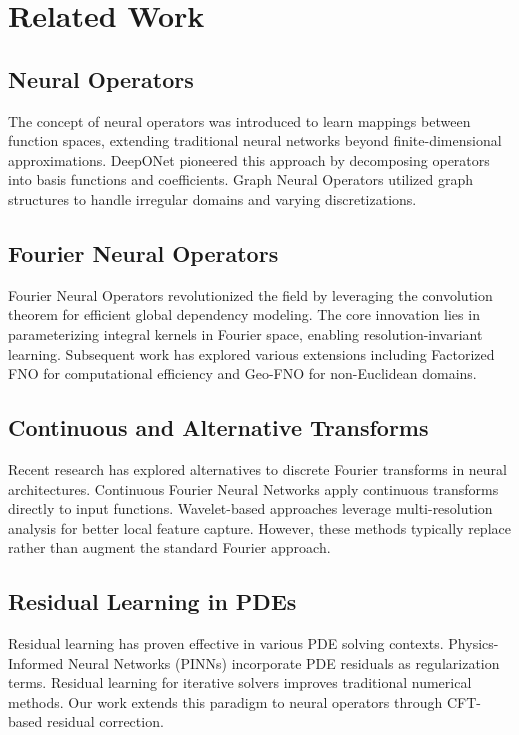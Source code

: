 \documentclass[11pt,twocolumn]{article}
\begin{document}
\section{Related Work}

\subsection{Neural Operators}
The concept of neural operators was introduced to learn mappings between function spaces, extending traditional neural networks beyond finite-dimensional approximations. DeepONet \citep{lu2021learning} pioneered this approach by decomposing operators into basis functions and coefficients. Graph Neural Operators \citep{li2020neural} utilized graph structures to handle irregular domains and varying discretizations.

\subsection{Fourier Neural Operators}
Fourier Neural Operators \citep{li2020fourier} revolutionized the field by leveraging the convolution theorem for efficient global dependency modeling. The core innovation lies in parameterizing integral kernels in Fourier space, enabling resolution-invariant learning. Subsequent work has explored various extensions including Factorized FNO \citep{tran2021factorized} for computational efficiency and Geo-FNO \citep{li2022fourier} for non-Euclidean domains.

\subsection{Continuous and Alternative Transforms}
Recent research has explored alternatives to discrete Fourier transforms in neural architectures. Continuous Fourier Neural Networks \citep{chen2021continuous} apply continuous transforms directly to input functions. Wavelet-based approaches \citep{gupta2021multiwavelet} leverage multi-resolution analysis for better local feature capture. However, these methods typically replace rather than augment the standard Fourier approach.

\subsection{Residual Learning in PDEs}
Residual learning has proven effective in various PDE solving contexts. Physics-Informed Neural Networks (PINNs) \citep{raissi2019physics} incorporate PDE residuals as regularization terms. Residual learning for iterative solvers \citep{greenfeld2019learning} improves traditional numerical methods. Our work extends this paradigm to neural operators through CFT-based residual correction.
\end{document}
